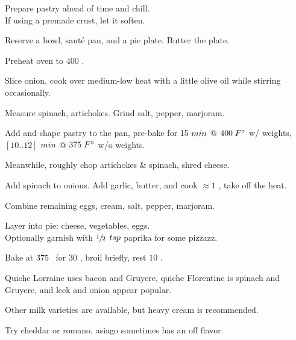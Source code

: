 \begin{preparation}
\item Prepare pastry ahead of time and chill.\\
    If using a premade crust, let it soften.

\item Reserve a bowl, saut\'{e} pan, and a pie plate. Butter the plate.

\item Preheat oven to $400$ \Fahrenheit.

\item Slice onion, cook over medium-low heat with a little olive oil while stirring occasionally.

\item Measure spinach, artichokes. Grind salt, pepper, marjoram.

\item Add and shape pastry to the pan, pre-bake for 15 $\minute$ @ $400\;\Fahrenheit$ w/ weights, $[10..12]$
    $\minute$ @ $375\;\Fahrenheit$ w/o weights.

\item Meanwhile, roughly chop artichokes \& spinach, shred cheese.

\item Add spinach to onions.
    Add garlic, butter, and cook $\approx 1$ \minute, take off the heat.

\item Combine remaining eggs, cream, salt, pepper, marjoram.

\item Layer into pie: cheese, vegetables, eggs.\\
    Optionally garnish with $\onehalf$ $\teaspoon$ paprika for some pizzazz.

\item Bake at $375$ \Fahrenheit~for $30$ \minute, broil briefly, rest $10$ \minute.
\end{preparation}

\begin{variation}
\item Quiche Lorraine uses bacon and Gruyere, quiche Florentine is spinach and Gruyere, and leek and onion
    appear popular.

\item Other milk varieties are available, but heavy cream is recommended.
\end{variation}

\begin{experiments}
\item Try cheddar or romano, asiago sometimes has an off flavor.
\end{experiments}

\recipeend%
